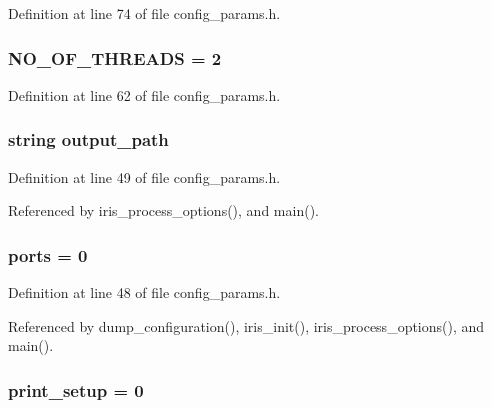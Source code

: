 Definition at line 74 of file config\_\-params.h.
\subsubsection[{NO\_\-OF\_\-THREADS}]{ {\bf NO\_\-OF\_\-THREADS} = 2}\label{config__params_8h_550c282169249cd6a9f0eb1b19bb8e04}




Definition at line 62 of file config\_\-params.h.
\subsubsection[{output\_\-path}]{\setlength{\rightskip}{0pt plus 5cm}string {\bf output\_\-path}}\label{config__params_8h_158e7a8aea404ddb87ba944c86a50aee}




Definition at line 49 of file config\_\-params.h.

Referenced by iris\_\-process\_\-options(), and main().
\subsubsection[{ports}]{ {\bf ports} = 0}\label{config__params_8h_5ec6842eb657670f90f816ebed1a3371}




Definition at line 48 of file config\_\-params.h.

Referenced by dump\_\-configuration(), iris\_\-init(), iris\_\-process\_\-options(), and main().
\subsubsection[{print\_\-setup}]{ {\bf print\_\-setup} = 0}\label{config__params_8h_7452dad8b46b310822227835f5344cd6}




